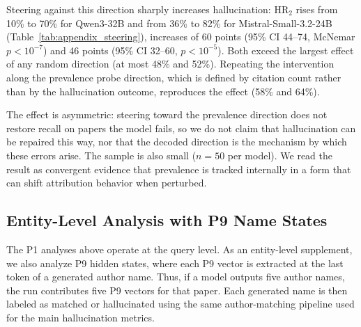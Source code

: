\documentclass[11pt]{article}
\begin{document}
Steering against this direction sharply increases hallucination: HR$_2$ rises from 10\% to 70\% for Qwen3-32B and from 36\% to 82\% for Mistral-Small-3.2-24B (Table~\ref{tab:appendix_steering}), increases of 60 points (95\% CI 44--74, McNemar $p < 10^{-7}$) and 46 points (95\% CI 32--60, $p < 10^{-5}$). Both exceed the largest effect of any random direction (at most 48\% and 52\%). Repeating the intervention along the prevalence probe direction, which is defined by citation count rather than by the hallucination outcome, reproduces the effect (58\% and 64\%).

The effect is asymmetric: steering toward the prevalence direction does not restore recall on papers the model fails, so we do not claim that hallucination can be repaired this way, nor that the decoded direction is the mechanism by which these errors arise. The sample is also small ($n = 50$ per model). We read the result as convergent evidence that prevalence is tracked internally in a form that can shift attribution behavior when perturbed.

\setlength{\tabcolsep}{4pt}
\begin{table}[t]
\centering
\footnotesize
{}
\caption{Hallucination rate (HR$_2$) under activation steering at $\alpha = -2$, with $n = 50$ papers per model that the model attributes correctly without intervention. The last column reports the range over five norm-matched random directions.}
\label{tab:appendix_steering}
\end{table}

\subsection{Entity-Level Analysis with P9 Name States}

The P1 analyses above operate at the query level. As an entity-level supplement, we also analyze P9 hidden states, where each P9 vector is extracted at the last token of a generated author name. Thus, if a model outputs five author names, the run contributes five P9 vectors for that paper. Each generated name is then labeled as matched or hallucinated using the same author-matching pipeline used for the main hallucination metrics.
\end{document}
